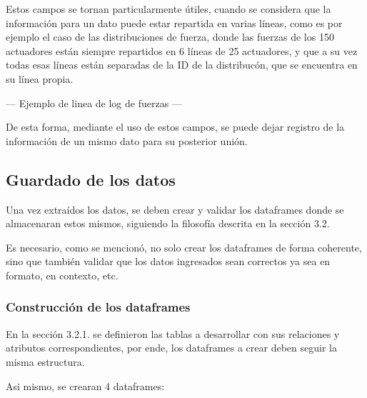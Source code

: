 Estos campos se tornan particularmente útiles, cuando se considera que la información para un dato puede estar repartida en varias líneas, como es por ejemplo el caso de las distribuciones de fuerza, donde las fuerzas de los 150 actuadores están siempre repartidos en 6 líneas de 25 actuadores, y que a su vez todas esas líneas están separadas de la ID de la distribucón, que se encuentra en su línea propia.

--- Ejemplo de linea de log de fuerzas ---

De esta forma, mediante el uso de estos campos, se puede dejar registro de la información de un mismo dato para su posterior unión.

\subsection{Guardado de los datos}

Una vez extraídos los datos, se deben crear y validar los dataframes donde se almacenaran estos mismos, siguiendo la filosofía descrita en la sección 3.2.

Es necesario, como se mencionó, no solo crear los dataframes de forma coherente, sino que también validar que los datos ingresados sean correctos ya sea en formato, en contexto, etc.

\subsubsection{Construcción de los dataframes}

En la sección 3.2.1. se definieron las tablas a desarrollar con sus relaciones y atributos correspondientes, por ende, los dataframes a crear deben seguir la misma estructura.

Asi mismo, se crearan 4 dataframes:

